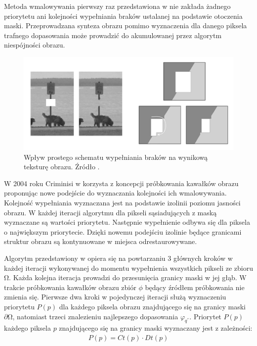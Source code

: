 \documentclass[12pt, twoside, openany]{report}
\theoremstyle{definition}
\begin{document}
Metoda wmalowywania pierwszy raz przedstawiona w  \cite{efros1999texture} nie zakłada żadnego priorytetu ani kolejności wypełniania braków ustalanej na podstawie otoczenia maski. Przeprowadzana synteza obrazu pomimo wyznaczenia dla danego piksela trafnego dopasowania może prowadzić do akumulowanej przez algorytm niespójności obrazu.
\begin{figure}[!h]
	\centering
	\includegraphics[scale=1]{rysunki/4_fig2}
	\caption{Wpływ prostego schematu wypełniania braków na wynikową teksturę obrazu. Źródło \cite{criminisi2004region}.}
	\label{4_fig2} 
\end{figure}
\par
W 2004 roku Criminisi w \cite{criminisi2004region} korzysta z koncepcji próbkowania kawałków obrazu proponując nowe podejście do wyznaczania kolejności ich wmalowywania.  Kolejność wypełniania wyznaczana jest na podstawie izolinii poziomu jasności obrazu. W każdej iteracji algorytmu dla pikseli sąsiadujących z maską wyznaczane są wartości priorytetu. Następnie wypełnienie odbywa się dla piksela o największym priorytecie. Dzięki nowemu podejściu izolinie będące granicami struktur obrazu są kontynuowane w miejsca odrestaurowywane.
\par
Algorytm przedstawiony w \cite{criminisi2004region} opiera się na powtarzaniu 3 głównych kroków w każdej iteracji wykonywanej do momentu wypełnienia wszystkich pikseli ze zbioru $\mathrm{\Omega }$. Każda kolejna iteracja prowadzi do przesunięcia granicy maski w jej głąb. W trakcie próbkowania kawałków obrazu zbiór $\phi $ będący źródłem próbkowania nie zmienia się. Pierwsze dwa kroki w pojedynczej iteracji służą wyznaczeniu priorytetu $P\left(p\right)$ dla każdego piksela obrazu znajdującego się na granicy maski $\partial \mathrm{\Omega }$, natomiast trzeci znalezieniu najlepszego dopasowania ${\varphi }_{q^{''}}$. Priorytet $P\left(p\right)$ każdego piksela $p$ znajdującego się na granicy maski wyznaczany jest z zależności:
\begin{align}
P\left(p\right)=Ct(p)\cdot Dt(p)
\label{PRIORITY}
\end{align}
\end{document}
